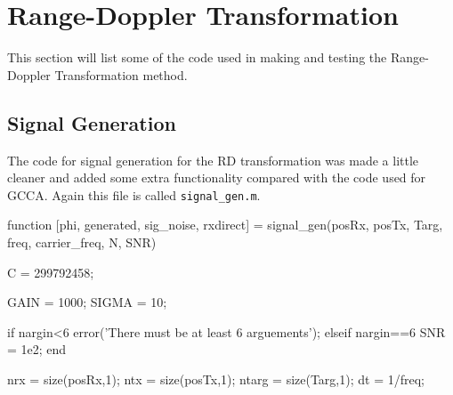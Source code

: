 \documentclass[12pt,openany,a4paper]{book}
\begin{document}
\section{Range-Doppler Transformation}
\label{app:rdt}
This section will list some of the code used in making and testing the Range-Doppler Transformation method.
\subsection{Signal Generation}
The code for signal generation for the RD transformation was made a little cleaner and added some extra functionality compared with the code used for GCCA. Again this file is called \verb+signal_gen.m+.

\begin{spverbatim}
function [phi, generated, sig_noise, rxdirect] = signal_gen(posRx, posTx, Targ, freq, carrier_freq, N, SNR)
%
%
%

C = 299792458;

GAIN = 1000; %
SIGMA = 10; %

if nargin<6
    error('There must be at least 6 arguements');
elseif nargin==6
    SNR = 1e2;
end

nrx = size(posRx,1);
ntx = size(posTx,1);
ntarg = size(Targ,1);
dt = 1/freq;


\end{spverbatim}
\end{document}
